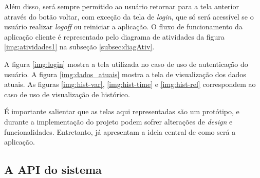 \begin{figure}[!htb]
\label{fig:dag}
\end{figure}

Além disso, será sempre permitido ao usuário retornar para a tela anterior através do botão voltar, com exceção da tela de \textit{login}, que só será acessível se o usuário realizar \textit{logoff} ou reiniciar a aplicação. O fluxo de funcionamento da aplicação cliente é representado pelo diagrama de atividades da figura \ref{img:atividades1} na subseção \ref{subsec:diagAtiv}.

A figura \ref{img:login} mostra a tela utilizada no caso de uso de autenticação do usuário. A figura \ref{img:dados_atuais} mostra a tela de visualização dos dados atuais. As figuras \ref{img:hist-var}, \ref{img:hist-time} e \ref{img:hist-rel} correspondem ao caso de uso de visualização de histórico.

É importante salientar que as telas aqui representadas são um protótipo, e durante a implementação do projeto podem sofrer alterações de \textit{design} e funcionalidades. Entretanto, já apresentam a ideia central de como será a aplicação.

\subsection{A API do sistema} \label{subsec:api}

